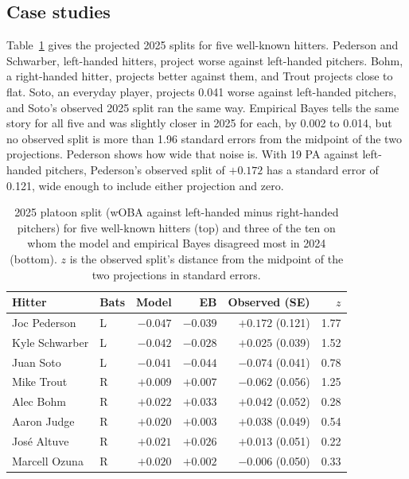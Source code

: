 \documentclass[11pt,letterpaper]{article}
\let\oldsubsection\subsection
\renewcommand\subsection{\FloatBarrier\oldsubsection}
\begin{document}
\subsection{Case studies}
\label{sec:anchors}\label{sec:disagree}

Table~\ref{tab:cases} gives the projected 2025 splits for five well-known hitters. Pederson and Schwarber, left-handed hitters, project worse against left-handed pitchers. Bohm, a right-handed hitter, projects better against them, and Trout projects close to flat. Soto, an everyday player, projects 0.041 worse against left-handed pitchers, and Soto's observed 2025 split ran the same way. Empirical Bayes tells the same story for all five and was slightly closer in 2025 for each, by 0.002 to 0.014, but no observed split is more than 1.96 standard errors from the midpoint of the two projections. Pederson shows how wide that noise is. With 19 PA against left-handed pitchers, Pederson's observed split of $+0.172$ has a standard error of 0.121, wide enough to include either projection and zero.

\begin{table}[!ht]
\centering\small
\begin{tabular}{llrrrr}
\toprule
Hitter & Bats & Model & EB & Observed (SE) & $z$ \\
\midrule
Joc Pederson & L & $-0.047$ & $-0.039$ & $+0.172$ (0.121) & 1.77 \\
Kyle Schwarber & L & $-0.042$ & $-0.028$ & $+0.025$ (0.039) & 1.52 \\
Juan Soto & L & $-0.041$ & $-0.044$ & $-0.074$ (0.041) & 0.78 \\
Mike Trout & R & $+0.009$ & $+0.007$ & $-0.062$ (0.056) & 1.25 \\
Alec Bohm & R & $+0.022$ & $+0.033$ & $+0.042$ (0.052) & 0.28 \\
\midrule
Aaron Judge & R & $+0.020$ & $+0.003$ & $+0.038$ (0.049) & 0.54 \\
José Altuve & R & $+0.021$ & $+0.026$ & $+0.013$ (0.051) & 0.22 \\
Marcell Ozuna & R & $+0.020$ & $+0.002$ & $-0.006$ (0.050) & 0.33 \\
\bottomrule
\end{tabular}
\caption{2025 platoon split (wOBA against left-handed minus right-handed pitchers) for five well-known hitters (top) and three of the ten on whom the model and empirical Bayes disagreed most in 2024 (bottom). $z$ is the observed split's distance from the midpoint of the two projections in standard errors.}
\label{tab:cases}
\end{table}
\end{document}
